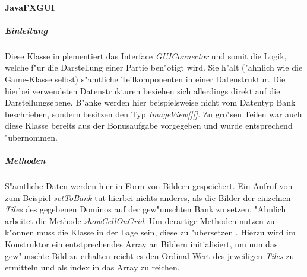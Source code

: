 \paragraph{JavaFXGUI}
\label{par:javaFXGUI}

\subparagraph{Einleitung}
Diese Klasse implementiert das Interface \emph{GUIConnector} und somit die Logik, welche f"ur die Darstellung einer Partie ben"otigt wird. Sie h"alt ("ahnlich wie die Game-Klasse selbst) s"amtliche Teilkomponenten in einer Datenstruktur. Die hierbei verwendeten Datenstrukturen beziehen sich allerdings direkt auf die Darstellungsebene. B"anke werden hier beispielsweise nicht vom Datentyp Bank beschrieben, sondern besitzen den Typ \emph{ImageView[][]}. Zu gro"sen Teilen war auch diese Klasse bereits aus der Bonusaufgabe vorgegeben und wurde entsprechend "ubernommen. 

\subparagraph{Methoden}
S"amtliche Daten werden hier in Form von Bildern gespeichert. Ein Aufruf von zum Beispiel \emph{setToBank} tut hierbei nichts anderes, als die Bilder der einzelnen \emph{Tiles} des gegebenen Dominos auf der gew"unschten Bank zu setzen. "Ahnlich arbeitet die Methode \emph{showCellOnGrid}. Um derartige Methoden nutzen zu k"onnen muss die Klasse in der Lage sein, diese zu \glqq "ubersetzen \grqq . Hierzu wird im Konstruktor ein entstprechendes Array an Bildern initialisiert, um nun das gew"unschte Bild zu erhalten reicht es den Ordinal-Wert des jeweiligen \emph{Tiles} zu ermitteln und als index in das Array zu reichen. 